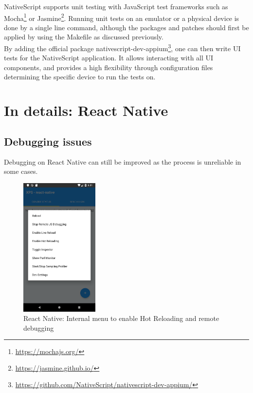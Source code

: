 \documentclass[11pt, a4paper, twoside, openright]{article} %
\begin{document}
{NativeScript supports unit testing with JavaScript test frameworks such as Mocha\footnote{\url{https://mochajs.org/}} or Jasmine\footnote{\url{https://jasmine.github.io/}}. Running unit tests on an emulator or a physical device is done by a single line command, although the packages and patches should first be applied by using the Makefile as discussed previously.\\
By adding the official package nativescript-dev-appium\footnote{\url{https://github.com/NativeScript/nativescript-dev-appium/}}, one can then write UI tests for the NativeScript application. It allows interacting with all UI components, and provides a high flexibility through configuration files determining the specific device to run the tests on.


\section{In details: React Native}
\subsection{Debugging issues}
\label{sub:appendix_react_debugging}

Debugging on React Native can still be improved as the process is unreliable in some cases.\\

\begin{figure}
	\centering
	\includegraphics[width=0.35\textwidth]{img/react_dev_menu.png}
	
	\caption{React Native: Internal menu to enable Hot Reloading and remote debugging}
	\label{fig:react_dev_menu}
\end{figure}

}
\end{document}
